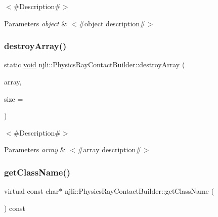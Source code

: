 $<$\#\+Description\#$>$


\begin{DoxyParams}{Parameters}
{\em object} & $<$\#object description\#$>$ \\
\hline
\end{DoxyParams}
\mbox{\label{classnjli_1_1_physics_ray_contact_builder_ac2940123b0ac1ad19d09278453d55bff}} 
\subsubsection{\texorpdfstring{destroy\+Array()}{destroyArray()}}
{\footnotesize\ttfamily static \mbox{\hyperlink{_thread_8h_af1e856da2e658414cb2456cb6f7ebc66}{void}} njli\+::\+Physics\+Ray\+Contact\+Builder\+::destroy\+Array (\begin{DoxyParamCaption}\item[{\mbox{\hyperlink{classnjli_1_1_physics_ray_contact_builder}{Physics\+Ray\+Contact\+Builder}} $\ast$$\ast$}]{array,  }\item[{const \mbox{\hyperlink{_util_8h_a10e94b422ef0c20dcdec20d31a1f5049}{u32}}}]{size = {} }\end{DoxyParamCaption})\hspace{0.3cm}{\ttfamily [static]}}

$<$\#\+Description\#$>$


\begin{DoxyParams}{Parameters}
{\em array} & $<$\#array description\#$>$ \\
\hline
\end{DoxyParams}
\mbox{\label{classnjli_1_1_physics_ray_contact_builder_a55fed195f3192a411c978c18a21c816a}} 
\subsubsection{\texorpdfstring{get\+Class\+Name()}{getClassName()}}
{\footnotesize\ttfamily virtual const char$\ast$ njli\+::\+Physics\+Ray\+Contact\+Builder\+::get\+Class\+Name (\begin{DoxyParamCaption}{ }\end{DoxyParamCaption}) const\hspace{0.3cm}{\ttfamily [virtual]}}

